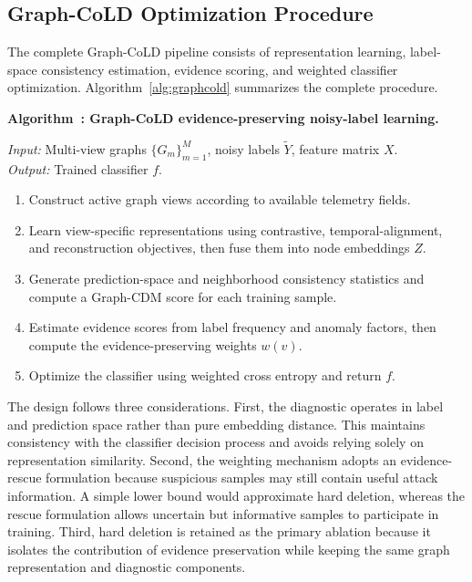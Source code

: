 \documentclass[preprint,3p,times]{elsarticle}
\newcounter{algorithm}
\renewcommand{\thealgorithm}{\arabic{algorithm}}
\begin{document}

\subsection{Graph-CoLD Optimization Procedure}

The complete Graph-CoLD pipeline consists of representation learning,
label-space consistency estimation, evidence scoring, and weighted classifier
optimization. Algorithm~\ref{alg:graphcold} summarizes the complete procedure.

\begin{center}
\label{alg:graphcold}
\begin{minipage}{0.92\linewidth}
\textbf{Algorithm~\thealgorithm: Graph-CoLD evidence-preserving noisy-label learning.}

\textit{Input:} Multi-view graphs $\{G_m\}_{m=1}^{M}$, noisy labels
$\tilde{Y}$, feature matrix $X$. \\
\textit{Output:} Trained classifier $f$.

\begin{enumerate}
\item Construct active graph views according to available telemetry fields.
\item Learn view-specific representations using contrastive, temporal-alignment,
and reconstruction objectives, then fuse them into node embeddings $Z$.
\item Generate prediction-space and neighborhood consistency statistics and
compute a Graph-CDM score for each training sample.
\item Estimate evidence scores from label frequency and anomaly factors, then
compute the evidence-preserving weights $w(v)$.
\item Optimize the classifier using weighted cross entropy and return $f$.
\end{enumerate}
\end{minipage}
\end{center}

The design follows three considerations. First, the diagnostic operates in label
and prediction space rather than pure embedding distance. This maintains
consistency with the classifier decision process and avoids relying solely on
representation similarity. Second, the weighting mechanism adopts an
evidence-rescue formulation because suspicious samples may still contain useful
attack information. A simple lower bound would approximate hard deletion,
whereas the rescue formulation allows uncertain but informative samples to
participate in training. Third, hard deletion is retained as the primary
ablation because it isolates the contribution of evidence preservation while
keeping the same graph representation and diagnostic components.
\end{document}
